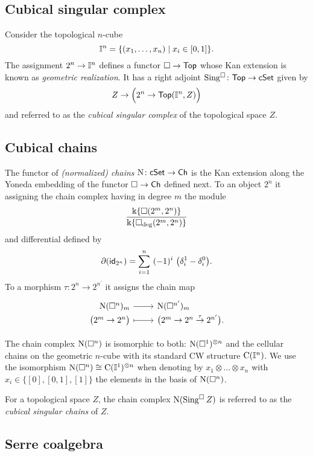 \subsection{Cubical singular complex}

Consider the topological $n$-cube
\[
\mathbb{I}^{n} = \{(x_1, \dots, x_n) \mid x_i \in [0,1]\}.
\]
The assignment $2^n \to \mathbb{I}^n$ defines a functor $\square \to \mathsf{Top}$ whose Kan extension is known as \textit{geometric realization}.
It has a right adjoint $\operatorname{Sing^{\square}} \colon \mathsf{Top} \to \mathsf{cSet}$ given by
\[
Z \to \Big(2^n \to \mathsf{Top}(\mathbb{I}^n, Z)\Big)
\]
and referred to as the \textit{cubical singular complex} of the topological space $Z$.

\subsection{Cubical chains}

The functor of \textit{(normalized) chains} $\operatorname{N} \colon \mathsf{cSet} \to \mathsf{Ch}$ is the Kan extension along the Yoneda embedding of the functor $\square \to \mathsf{Ch}$ defined next.
To an object $2^n$ it assigning the chain complex having in degree $m$ the module
\[
\frac{\Bbbk\{\square(2^m, 2^n)\}}{\Bbbk\{\square_{\deg}(2^m, 2^n)\}}
\]
and differential defined by
\[
\partial (\id_{2^n}) = \sum_{i=1}^{n} \ (-1)^i \
\big(\delta_i^1 - \delta_i^0 \big).
\]
To a morphism $\tau \colon 2^n \to 2^{n^\prime}$ it assigns the chain map
\[
\begin{tikzcd}[row sep=-3pt, column sep=normal,
/tikz/column 1/.append style={anchor=base east},
/tikz/column 2/.append style={anchor=base west}]
\chains(\cube^n)_m \arrow[r] & \chains(\cube^{n^\prime})_m \\
\big( 2^m \to 2^n \big) \arrow[r, mapsto] & \big( 2^m \to 2^n \stackrel{\tau}{\to} 2^{n^\prime} \big).
\end{tikzcd}
\]

The chain complex $\operatorname{N}(\square^n)$ is isomorphic to both: $\operatorname{N}(\square^1)^{\otimes n}$ and the cellular chains on the geometric $n$-cube with its standard CW structure $\operatorname{C}(\mathbb{I}^n)$.
We use the isomorphism $\operatorname{N}(\square^n) \cong \operatorname{C}(\mathbb{I}^1)^{\otimes n}$ when denoting by $x_1 \otimes \dots \otimes x_n$ with $x_i \in \{[0], [0,1], [1]\}$ the elements in the basis of $\operatorname{N}(\square^n)$.

For a topological space $Z$, the chain complex $\operatorname{N}(\operatorname{Sing^{\square}} Z)$ is referred to as the \textit{cubical singular chains} of $Z$.

\subsection{Serre coalgebra} \label{ss:serre coalgebra}

